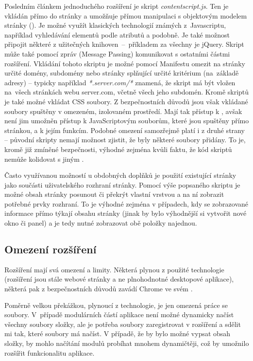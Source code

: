 Posledním článkem jednoduchého rozšíření je skript \textit{contentscript.js}. Ten je vkládán přímo do stránky a umožňuje přímou manipulaci s objektovým modelem stránky (). Je možné využít klasických technologií známých z~Ja\-va\-scrip\-tu, například vyhledávání elementů podle atributů a podobně. Je také možnost připojit některé z užitečných kni\-ho\-ven~--~pří\-kla\-dem za všechny je jQuery. Skript může také pomocí zpráv (Message Passing) komunikovat s ostatními částmi rozšíření. Vkládání tohoto skriptu je možné pomocí Manifestu omezit na stránky určité domény, subdomény nebo stránky splňující určité kritérium (na~základě adresy) -- typicky například \textit{*.server.com/*} znamená, že skript má být vložen na~všech stránkách webu server.com, včetně všech jeho subdomén. Kromě skriptů je také možné vkládat CSS soubory. Z bezpečnostních důvodů jsou však vkládané soubory spuštěny v omezeném, izolovaném prostředí. Mají tak přístup k , avšak není jim umožněn přístup k JavaScriptovým souborům, které jsou spuštěny přímo stránkou, a k jejím funkcím. Podobné omezení samozřejmě platí i z druhé strany -- původní skripty nemají možnost zjistit, že byly některé soubory přidány. To je, kromě již zmíněné bezpečnosti, výhodné zejména kvůli faktu, že kód skriptů nemůže kolidovat s jiným \cite{chromelimitations}.

Často využívanou možností u obdobných doplňků je použití existující stránky jako součásti uživatelského rozhraní stránky. Pomocí výše popsaného skriptu je možné obsah stránky posunout či překrýt vlastní vrstvou a na ní zobrazit potřebné prvky rozhraní. To je výhodné zejména v případech, kdy se zobrazované informace přímo týkají obsahu stránky (jinak by bylo výhodnější si vytvořit nové okno či panel) a je tedy nutné zobrazovat obě položky najednou.

\subsection{Omezení rozšíření}
Rozšíření mají svá omezení a limity. Některá plynou z použité technologie (rozšíření jsou stále webové stránky a ne plnohodnotné desktopové aplikace), některá pak z bezpečnostních důvodů zavádí Chrome ve svém . 

Poměrně velkou překážkou, plynoucí z technologie, je jen omezená práce se soubory. V~případě modulárních částí aplikace není možné dynamicky načíst všechny soubory složky, ale je potřeba soubory zaregistrovat v rozšíření a sdělit mi tak, které soubory má načíst. V případě, že by bylo možné vypsat obsah složky, by mohlo načítání modulů probíhat mnohem dynamičtěji, což by umožnilo rozšířit funkcionalitu aplikace.

